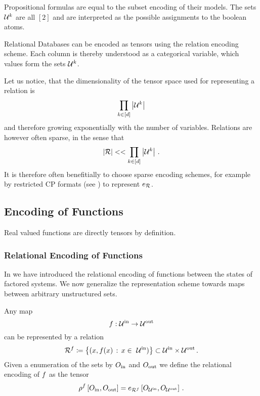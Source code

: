 \begin{example}
	Propositional formulas are equal to the subset encoding of their models.
	The sets $\mathcal{U}^{k}$ are all $[2]$ and are interpreted as the possible assignments to the boolean atoms.
\end{example}


\begin{example}
	Relational Databases can be encoded as tensors using the relation encoding scheme.
	Each column is thereby understood as a categorical variable, which values form the sets $\mathcal{U}^{k}$.
\end{example}

Let us notice, that the dimensionality of the tensor space used for representing a relation is 
	\[ \prod_{k\in[d]} \left|\mathcal{U}^{k}\right| \]
and therefore growing exponentially with the number of variables.
Relations are however often sparse, in the sense that 
	\[ \left|\mathcal{R}\right| << \prod_{k\in[d]} \left|\mathcal{U}^{k}\right| \, . \]
It is therefore often benefitially to choose sparse encoding schemes, for example by restricted CP formats (see ) to represent $e_{\mathcal{R}}$.

\subsection{Encoding of Functions}

Real valued functions are directly tensors by definition.

\subsubsection{Relational Encoding of Functions}

In  we have introduced the relational encoding of functions between the states of factored systems.
We now generalize the representation scheme towards maps between arbitrary unstructured sets.

\begin{definition}\label{def:functionRelationEncoding}
	Any map
		\[ f : \mathcal{U}^{\mathrm{in}} \rightarrow \mathcal{U}^{\mathrm{out}} \]
	can be represented by a relation
		\[ \exrelationof{\exfunction} \coloneqq \left\{ (x,\exfunction(x) \, : \, x \in \inset )\right\} \subset \inset \times \outset \, . \]
	Given a enumeration of the sets by $O_{\mathrm{in}}$ and $O_{\mathrm{out}}$ we define the relational encoding of $f$ as the tensor
		\[ \rho^{f}\left[O_{\mathrm{in}},O_{\mathrm{out}}\right] = e_{\mathcal{R}^{f}}\left[O_{\mathcal{U}^{\mathrm{in}}},O_{\mathcal{U}^{\mathrm{out}}}\right]  \, . \]
\end{definition}

